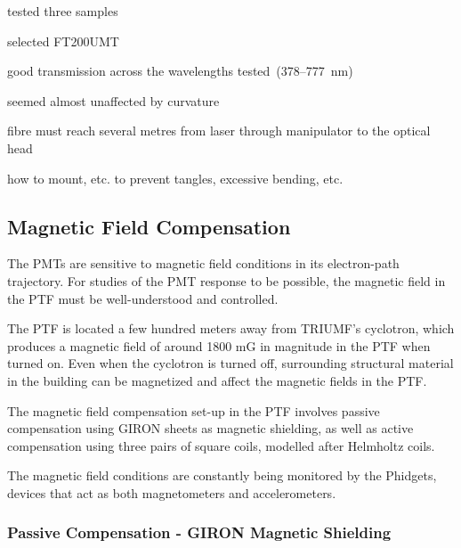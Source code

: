 tested three samples

selected FT200UMT

good transmission across the wavelengths tested~(378--777~nm)

seemed almost unaffected by curvature

fibre must reach several metres from laser through manipulator to the
optical head

how to mount, etc. to prevent tangles, excessive bending, etc.


\subsection{Magnetic Field Compensation}
\label{Sec:MagFieldCompensation}

The PMTs are sensitive to magnetic field conditions in its electron-path trajectory. For studies of the PMT response to be possible, the magnetic field in the PTF must be well-understood and controlled.

The PTF is located a few hundred meters away from TRIUMF's cyclotron, which produces a magnetic field of around 1800 mG in magnitude in the PTF when turned on. Even when the cyclotron is turned off, surrounding structural material in the building can be magnetized and affect the magnetic fields in the PTF.

The magnetic field compensation set-up in the PTF involves passive compensation using GIRON sheets as magnetic shielding, as well as active compensation using three pairs of square coils, modelled after Helmholtz coils.

The magnetic field conditions are constantly being monitored by the Phidgets, devices that act as both magnetometers and accelerometers.

\subsubsection{Passive Compensation - GIRON Magnetic Shielding}


